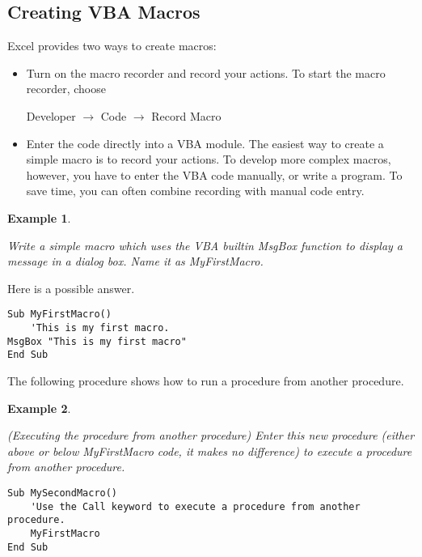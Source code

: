 \documentclass[
]{article}
\theoremstyle{definition}
\theoremstyle{definition}
\newtheorem{example}{Example}[section]
\theoremstyle{definition}
\theoremstyle{definition}
\theoremstyle{remark}
\begin{document}
\hypertarget{creating-vba-macros}{%
\subsection{Creating VBA Macros}\label{creating-vba-macros}}

Excel provides two ways to create macros:

\begin{itemize}
\item
  Turn on the macro recorder and record your actions. To start the
  macro recorder, choose

  Developer \(\rightarrow\) Code \(\rightarrow\) Record Macro
\item
  Enter the code directly into a VBA module. The easiest way to create
  a simple macro is to record your actions. To develop more complex
  macros, however, you have to enter the VBA code manually, or write a
  program. To save time, you can often combine recording with manual
  code entry.
\end{itemize}

\begin{example}
\protect\hypertarget{exm:unlabeled-div-21}{}\label{exm:unlabeled-div-21}

\emph{Write a simple macro which uses the VBA builtin MsgBox
function to display a message in a dialog box. Name it as MyFirstMacro.}

\end{example}

Here is a possible answer.

\begin{verbatim}
Sub MyFirstMacro()
    'This is my first macro.
MsgBox "This is my first macro"
End Sub
\end{verbatim}

The following procedure shows how to run a procedure from another
procedure.

\begin{example}
\protect\hypertarget{exm:unlabeled-div-22}{}\label{exm:unlabeled-div-22}

\emph{(Executing the procedure from another procedure) Enter
this new procedure (either above or below MyFirstMacro code, it makes no
difference) to execute a procedure from another procedure.}

\end{example}

\begin{verbatim}
Sub MySecondMacro()
    'Use the Call keyword to execute a procedure from another procedure.
    MyFirstMacro
End Sub
\end{verbatim}
\end{document}

